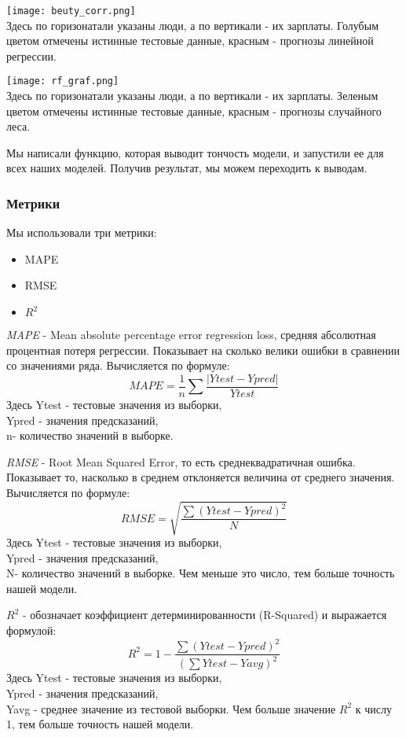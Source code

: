 \documentclass{article}
\begin{document}
\texttt{[image: beuty\_corr.png]}\\
Здесь по горизонатали указаны люди, а по вертикали - их зарплаты. Голубым цветом отмечены истинные тестовые данные, красным - прогнозы линейной регрессии.


\texttt{[image: rf\_graf.png]}\\
Здесь по горизонатали указаны люди, а по вертикали - их зарплаты. Зеленым цветом отмечены истинные тестовые данные, красным - прогнозы случайного леса.

Мы написали функцию, которая выводит тончость модели, и запустили ее для всех наших моделей. Получив результат, мы можем переходить к выводам.
\subsubsection{Метрики}
Мы использовали три метрики\cite{book:11}:
\begin{itemize}
     \color{red} \item \color{black} MAPE
     \color{red} \item \color{black} RMSE
     \color{red} \item \color{black} \(R^2 \)
\end{itemize}
\textit{MAPE} - Mean absolute percentage error regression loss\cite{WEBSITE:7}, средняя абсолютная процентная потеря регрессии. Показывает на сколько велики ошибки в сравнении со значениями ряда. Вычисляется по формуле: 
\begin{equation}
    MAPE = \frac{1}{n}{\sum\frac{ |Ytest - Ypred|
    }{Ytest}}
\end{equation}
Здесь Ytest - тестовые значения из выборки, \\ Ypred - значения предсказаний, \\n- количество значений в выборке. 
\bigskip

\textit{RMSE} - Root Mean Squared Error\cite{WEBSITE:8}, то есть среднеквадратичная ошибка. Показывает то, насколько в среднем отклоняется величина от среднего значения. Вычисляется по формуле: 
\begin{equation}
    RMSE = \sqrt{\frac{\sum (Ytest - Ypred)^2 }{N}}
\end{equation}
Здесь Ytest - тестовые значения из выборки, \\ Ypred - значения предсказаний, \\N- количество значений в выборке. 
Чем меньше это число, тем больше точность нашей модели.
\bigskip

\textit{$R^2$} - обозначает коэффициент детерминированности (R-Squared\cite{WEBSITE:9}) и выражается формулой:
\begin{equation}
    R^2 = 1 - \frac{\sum (Ytest - Ypred) ^2}{(\sum Ytest - Yavg )^2}
\end{equation}
Здесь Ytest - тестовые значения из выборки,\\ Ypred - значения предсказаний, \\ Yavg - среднее значение из тестовой выборки. Чем больше значение \(R^2 \) к числу 1, тем больше точность нашей модели. 
\end{document}
